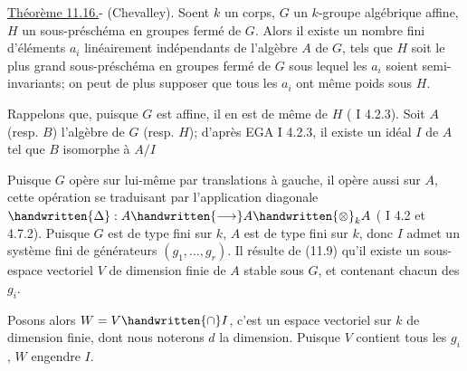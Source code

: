 
\uline{Théorème 11.16.}- (Chevalley). Soent $k$ un corps, $G$ un $k$-groupe algébrique affine, $H$ un sous-préschéma en groupes fermé de $G$. Alors il existe un nombre fini d'éléments $a_i$ linéairement indépendants de l'algèbre $A$ de $G$, tels que $H$ soit le plus grand sous-préschéma en groupes fermé de $G$ sous lequel les $a_i$ soient semi-invariants; on peut de plus supposer que tous les $a_i$ ont même  poids\deleted{)} sous $H$.

Rappelons que, puisque $G$ est affine, il en est de même de $H$ ( I 4.2.3). Soit $A$ (resp. $B$) l'algèbre de $G$ (resp. $H$); d'après EGA I 4.2.3, il existe un idéal $I$ de $A$ tel que $B$  isomorphe à $A/I$ Puisque $G$ opère sur lui-même par translations à gauche, il opère aussi sur $A$, cette opération se traduisant par l'application diagonale $\handwritten{\Delta}:A\handwritten{\longrightarrow}A\handwritten{\otimes}_k A$ ( I 4.2 et 4.7.2). Puisque $G$ est de type fini sur $k$, $A$ est de type fini sur $k$, donc $I$  admet un système fini de générateurs $(g_1,\ldots,g_r)$. Il résulte de (11.9) qu'il existe un sous-espace vectoriel $V$ de dimension finie de $A$  stable sous $G$, et contenant chacun des $g_i$.

Posons alors $W=V\handwritten{\cap}I$, c'est un espace vectoriel sur $k$ de dimension finie, dont nous noterons $d$ la dimension. Puisque $V$ contient tous les $g_i$, $W$ engendre  $I$.

